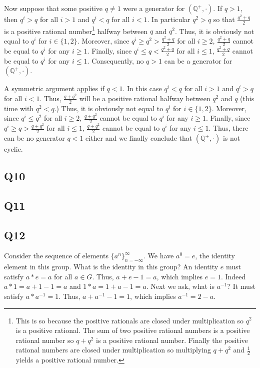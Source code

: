 \documentclass[12pt]{article}
\def\Q{{\mathbb Q}}        %
\numberwithin{theorem}{section}
\numberwithin{equation}{section}
\numberwithin{remark}{section}
\numberwithin{definition}{section}
\numberwithin{theorem}{section}
\numberwithin{lemma}{section}
\numberwithin{example}{section}
\begin{document}
Now suppose that some positive $q\neq1$ were a generator for $(\Q^+,\cdot)$. If $q>1$, then $q^i > q$ for all $i>1$ and $q^i < q$ for all $i<1$. In particular $q^2 > q$ so that $\frac{q^2+q}{2}$ is a positive rational number\footnote{This is so because the positive rationals are closed under multiplication so $q^2$ is a positive rational. The sum of two positive rational numbers is a positive rational number so $q+q^2$ is a positive rational number. Finally the positive rational numbers are closed under multiplication so multiplying $q+q^2$ and $\frac{1}{2}$ yields a positive rational number.} halfway between $q$ and $q^2$. Thus, it is obviously not equal to $q^i$ for $i\in\{1,2\}$. Moreover, since $q^i\ge q^2>\frac{q^2+q}{2}$ for all $i\ge 2$, $\frac{q^2+q}{2}$ cannot be equal to $q^i$ for any $i\ge 1$. Finally, since $q^i \le q < \frac{q^2+q}{2}$ for all $i\le 1$, $\frac{q^2+q}{2}$ cannot be equal to $q^i$ for any $i\le 1$. Consequently, no $q>1$ can be a generator for $(\Q^+,\cdot)$.

A symmetric argument applies if $q < 1$. In this case $q^i < q$ for all $i>1$ and $q^i > q$ for all $i<1$. Thus, $\frac{q+q^2}{2}$ will be a positive rational halfway between $q^2$ and $q$ (this time with $q^2<q$.) Thus, it is obviously not equal to $q^i$ for $i\in\{1,2\}$. Moreover, since $q^i \le q^2$ for all $i\ge 2$, $\frac{q+q^2}{2}$ cannot be equal to $q^i$ for any $i\ge 1$. Finally, since $q^i \ge q > \frac{q+q^2}{2}$ for all $i\le 1$, $\frac{q+q^2}{2}$ cannot be equal to $q^i$ for any $i\le 1$. Thus, there can be no generator $q<1$ either and we finally conclude that $(\Q^+,\cdot)$ is not cyclic. 




\subsection{Q10}

\subsection{Q11}

\subsection{Q12}

Consider the sequence of elements $\{a^n\}_{n=-\infty}^\infty$. We have $a^0=e$, the identity element in this group. What is the identity in this group? An identity $e$ must satisfy $a*e=a$ for all $a\in G$. Thus, $a+e-1=a$, which implies $e=1$. Indeed $a*1=a+1-1=a$ and $1*a=1+a-1=a$. Next we ask, what is $a^{-1}$? It must satisfy $a*a^{-1}=1$. Thus, $a+a^{-1}-1=1$, which implies $a^{-1}=2-a$. 
\end{document}
